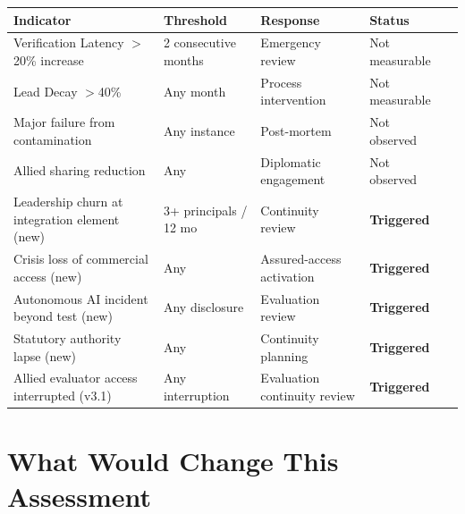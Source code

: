 \documentclass[11pt,letterpaper]{article}
\begin{document}
\begin{criticalbox}
\begin{center}
\scriptsize
\begin{tabularx}{\linewidth}{ZY{1.59}Y{0.83}Y{0.83}Y{0.75}}
\toprule
\textbf{Indicator} & \textbf{Threshold} & \textbf{Response} & \textbf{Status} \\
\midrule
Verification Latency $>$20\% increase & 2 consecutive months & Emergency review & Not measurable \\
Lead Decay $>$40\% & Any month & Process intervention & Not measurable \\
Major failure from contamination & Any instance & Post-mortem & Not observed \\
Allied sharing reduction & Any & Diplomatic engagement & Not observed \\
Leadership churn at integration element (new) & 3+ principals / 12 mo & Continuity review & \textbf{Triggered} \\
Crisis loss of commercial access (new) & Any & Assured-access activation & \textbf{Triggered} \\
Autonomous AI incident beyond test (new) & Any disclosure & Evaluation review & \textbf{Triggered} \\
Statutory authority lapse (new) & Any & Continuity planning & \textbf{Triggered} \\
Allied evaluator access interrupted (v3.1) & Any interruption & Evaluation continuity review & \textbf{Triggered} \\
\bottomrule
\end{tabularx}
\end{center}
\end{criticalbox}

\section{What Would Change This Assessment}
\end{document}
